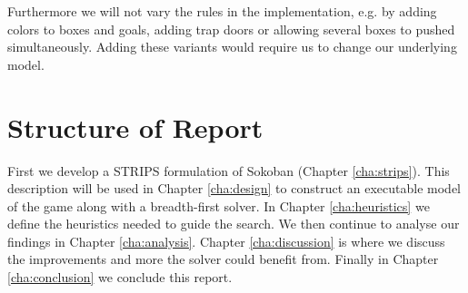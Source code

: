 Furthermore we will not vary the rules in the implementation, e.g. by
adding colors to boxes and goals, adding trap doors or allowing
several boxes to pushed simultaneously. Adding these variants would
require us to change our underlying model.

\section{Structure of Report}


First we develop a STRIPS formulation of Sokoban (Chapter
\ref{cha:strips}). This description will be used in Chapter
\ref{cha:design} to construct an executable model of the game along
with a breadth-first solver. In Chapter \ref{cha:heuristics} we define
the heuristics needed to guide the search. We then continue to analyse
our findings in Chapter \ref{cha:analysis}. Chapter
\ref{cha:discussion} is where we discuss the improvements and more the
solver could benefit from. Finally in Chapter \ref{cha:conclusion} we
conclude this report.


